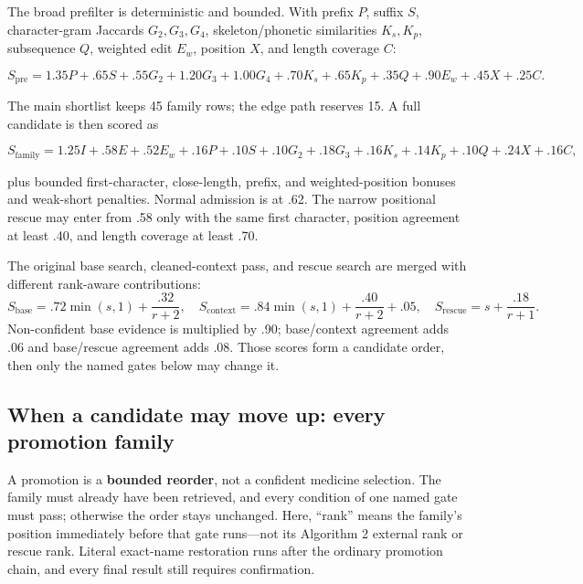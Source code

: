 \documentclass[10pt,a4paper]{article}
\begin{document}
The broad prefilter is deterministic and bounded. With prefix \(P\), suffix
\(S\), character-gram Jaccards \(G_2,G_3,G_4\), skeleton/phonetic
similarities \(K_s,K_p\), subsequence \(Q\), weighted edit \(E_w\), position
\(X\), and length coverage \(C\):

\[
S_{\mathrm{pre}}=1.35P+.65S+.55G_2+1.20G_3+1.00G_4
 +.70K_s+.65K_p+.35Q+.90E_w+.45X+.25C.
\]

The main shortlist keeps 45 family rows; the edge path reserves 15. A full
candidate is then scored as

\[
S_{\mathrm{family}}=1.25I+.58E+.52E_w+.16P+.10S+.10G_2+.18G_3
 +.16K_s+.14K_p+.10Q+.24X+.16C,
\]

plus bounded first-character, close-length, prefix, and weighted-position
bonuses and weak-short penalties. Normal admission is at .62. The narrow
positional rescue may enter from .58 only with the same first character,
position agreement at least .40, and length coverage at least .70.

The original base search, cleaned-context pass, and rescue search are merged
with different rank-aware contributions:
\[
S_{\mathrm{base}}=.72\min(s,1)+\frac{.32}{r+2},\quad
S_{\mathrm{context}}=.84\min(s,1)+\frac{.40}{r+2}+.05,\quad
S_{\mathrm{rescue}}=s+\frac{.18}{r+1}.
\]
Non-confident base evidence is multiplied by .90; base/context agreement adds
.06 and base/rescue agreement adds .08. Those scores form a candidate order,
then only the named gates below may change it.

\subsection{When a candidate may move up: every promotion family}

\begin{takeaway}[title=What ``promotion'' means]
A promotion is a \textbf{bounded reorder}, not a confident medicine selection.
The family must already have been retrieved, and every condition of one named
gate must pass; otherwise the order stays unchanged. Here, ``rank'' means the
family's position immediately before that gate runs---not its Algorithm 2
external rank or rescue rank. Literal exact-name restoration runs after the
ordinary promotion chain, and every final result still requires confirmation.
\end{takeaway}
\end{document}
